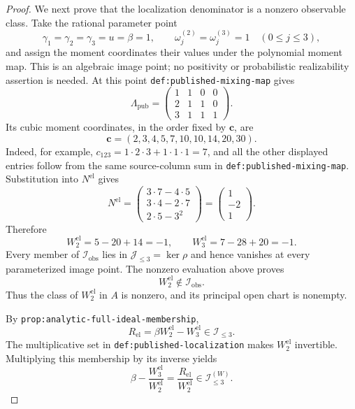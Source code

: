 \documentclass{article}
\begin{document}
\begin{proof}
We next prove that the localization denominator is a nonzero observable class.  Take the rational parameter point
\[
\gamma_1=\gamma_2=\gamma_3=u=\beta=1,
\qquad
\omega_j^{(2)}=\omega_j^{(3)}=1
\quad(0\leq j\leq3),
\]
and assign the moment coordinates their values under the polynomial moment map.  This is an algebraic image point; no positivity or probabilistic realizability assertion is needed.  At this point \texttt{def:published-mixing-map} gives
\[
\Lambda_{\mathrm{pub}}=
\begin{pmatrix}
1&1&0&0\\
2&1&1&0\\
3&1&1&1
\end{pmatrix}.
\]
Its cubic moment coordinates, in the order fixed by \(\mathbf c\), are
\[
\mathbf c=(2,3,4,5,7,10,10,14,20,30).
\]
Indeed, for example, \(c_{123}=1\cdot2\cdot3+1\cdot1\cdot1=7\), and all the other displayed entries follow from the same source-column sum in \texttt{def:published-mixing-map}.  Substitution into \(N^{\mathrm{el}}\) gives
\[
N^{\mathrm{el}}
=\begin{pmatrix}
3\cdot7-4\cdot5\\
3\cdot4-2\cdot7\\
2\cdot5-3^2
\end{pmatrix}
=\begin{pmatrix}1\\-2\\1\end{pmatrix}.
\]
Therefore
\[
W_2^{\mathrm{el}}=5-20+14=-1,
\qquad
W_3^{\mathrm{el}}=7-28+20=-1.
\]
Every member of \(\mathcal I_{\mathrm{obs}}\) lies in \(\mathcal J_{\leq3}=\ker\rho\) and hence vanishes at every parameterized image point.  The nonzero evaluation above proves
\[
W_2^{\mathrm{el}}\notin\mathcal I_{\mathrm{obs}}.
\]
Thus the class of \(W_2^{\mathrm{el}}\) in \(A\) is nonzero, and its principal open chart is nonempty.

By \texttt{prop:analytic-full-ideal-membership},
\[
R_{\mathrm{el}}=\beta W_2^{\mathrm{el}}-W_3^{\mathrm{el}}
\in\mathcal I_{\leq3}.
\]
The multiplicative set in \texttt{def:published-localization} makes \(W_2^{\mathrm{el}}\) invertible.  Multiplying this membership by its inverse yields
\[
\beta-\frac{W_3^{\mathrm{el}}}{W_2^{\mathrm{el}}}
=\frac{R_{\mathrm{el}}}{W_2^{\mathrm{el}}}
\in\mathcal I_{\leq3}^{(W)}.
\]


\end{proof}
\end{document}

